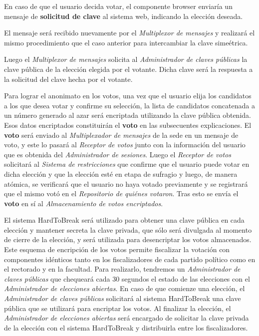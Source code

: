 En caso de que el usuario decida votar, el componente browser enviaría un mensaje de {\bf solicitud de clave} al sistema web, indicando la elección deseada. 

El mensaje será recibido nuevamente por el \emph{Multiplexor de mensajes} y realizar\'a el mismo procedimiento que el caso anterior para intercambiar la clave sime\'etrica.

Luego el \emph{Multiplexor de mensajes} solicita al \emph{Administrador de claves p\'ublicas} la clave p\'ublica de la elecci\'on elegida por el votante. Dicha clave ser\'a la respuesta a la solicitud del clave hecha por el votante.

Para lograr el anonimato en los votos, una vez que el usuario elija los candidatos a los que desea votar y confirme su selección, la lista de candidatos concatenada a un número generado al azar será encriptada utilizando la clave pública obtenida. 
Esos datos encriptados constituirán el {\bf voto} en las subsecuentes explicaciones. 
El {\bf voto} será enviado al \emph{Multiplexador de mensajes} de la sede en un mensaje de voto, y este lo pasar\'a al \emph{Receptor de votos} junto con la informaci\'on del usuario que es obtenida del \emph{Administrador de sesiones}. 
Luego el \emph{Receptor de votos} solicitará al \emph{Sistema de restricciones} que confirme que el usuario puede votar en dicha elección y que la elección esté en etapa de sufragio y luego, de manera atómica, se verificará que el usuario no haya votado previamente y se registrará que el mismo votó en el \emph{Repositorio de quiénes votaron}. Tras esto se envía el {\bf voto} en sí al \emph{Almacenamiento de votos encriptados}.

El sistema HardToBreak será utilizado para obtener una clave pública en cada elección y mantener secreta la clave privada, que sólo será divulgada al momento de cierre de la elección, y será utilizada para desencriptar los votos almacenados. 
Este esquema de encripción de los votos permite fiscalizar la votación con componentes idénticos tanto en los fiscalizadores de cada partido pol\'itico como en el rectorado y en la facultad. Para realizarlo, tendremos un \emph{Administrador de claves p\'ublicas} que chequear\'a cada 30 segundos el estado de las elecciones con el \emph{Administrador de elecciones abiertas}. En caso de que comienze una elecci\'on, el \emph{Administrador de claves p\'ublicas} solicitar\'a al sistema HardToBreak una clave p\'ublica que se utilizar\'a para encriptar los votos. Al finalizar la elecci\'on, el \emph{Administrador de elecciones abiertas} ser\'a encargado de solicitar la clave privada de la elecci\'on con el sistema HardToBreak y distribuirla entre los fiscalizadores.



